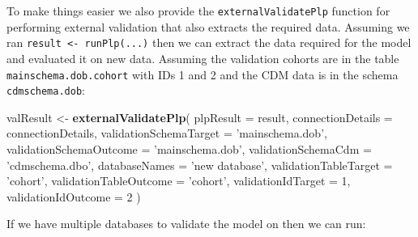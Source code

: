 \documentclass[11pt]{book}
\newenvironment{Shaded}{\begin{snugshade}}{\end{snugshade}}
\newcommand{\DataTypeTok}[1]{\textcolor[rgb]{0.13,0.29,0.53}{#1}}
\newcommand{\DecValTok}[1]{\textcolor[rgb]{0.00,0.00,0.81}{#1}}
\newcommand{\KeywordTok}[1]{\textcolor[rgb]{0.13,0.29,0.53}{\textbf{#1}}}
\newcommand{\NormalTok}[1]{#1}
\newcommand{\StringTok}[1]{\textcolor[rgb]{0.31,0.60,0.02}{#1}}
\theoremstyle{definition}
\theoremstyle{definition}
\theoremstyle{definition}
\theoremstyle{remark}
\begin{document}
To make things easier we also provide the \texttt{externalValidatePlp} function for performing external validation that also extracts the required data. Assuming we ran \texttt{result\ \textless{}-\ runPlp(...)} then we can extract the data required for the model and evaluated it on new data. Assuming the validation cohorts are in the table \texttt{mainschema.dob.cohort} with IDs 1 and 2 and the CDM data is in the schema \texttt{cdmschema.dob}:

\begin{Shaded}
\begin{Highlighting}[]
\NormalTok{valResult <-}\StringTok{ }\KeywordTok{externalValidatePlp}\NormalTok{(}
    \DataTypeTok{plpResult =}\NormalTok{ result, }
    \DataTypeTok{connectionDetails =}\NormalTok{ connectionDetails,}
    \DataTypeTok{validationSchemaTarget =} \StringTok{'mainschema.dob'}\NormalTok{,}
    \DataTypeTok{validationSchemaOutcome =} \StringTok{'mainschema.dob'}\NormalTok{,}
    \DataTypeTok{validationSchemaCdm =} \StringTok{'cdmschema.dbo'}\NormalTok{,}
    \DataTypeTok{databaseNames =} \StringTok{'new database'}\NormalTok{,}
    \DataTypeTok{validationTableTarget =} \StringTok{'cohort'}\NormalTok{,}
    \DataTypeTok{validationTableOutcome =} \StringTok{'cohort'}\NormalTok{,}
    \DataTypeTok{validationIdTarget =} \DecValTok{1}\NormalTok{,}
    \DataTypeTok{validationIdOutcome =} \DecValTok{2}
\NormalTok{)}
\end{Highlighting}
\end{Shaded}

If we have multiple databases to validate the model on then we can run:
\end{document}

